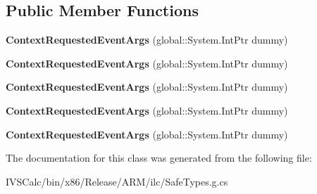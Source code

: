 \subsection*{Public Member Functions}
\begin{DoxyCompactItemize}
\item 
\mbox{\label{class_windows_1_1_u_i_1_1_xaml_1_1_input_1_1_context_requested_event_args_a840bb18409b213c829dc83f257d159c5}} 
{\bfseries Context\+Requested\+Event\+Args} (global\+::\+System.\+Int\+Ptr dummy)
\item 
\mbox{\label{class_windows_1_1_u_i_1_1_xaml_1_1_input_1_1_context_requested_event_args_a840bb18409b213c829dc83f257d159c5}} 
{\bfseries Context\+Requested\+Event\+Args} (global\+::\+System.\+Int\+Ptr dummy)
\item 
\mbox{\label{class_windows_1_1_u_i_1_1_xaml_1_1_input_1_1_context_requested_event_args_a840bb18409b213c829dc83f257d159c5}} 
{\bfseries Context\+Requested\+Event\+Args} (global\+::\+System.\+Int\+Ptr dummy)
\item 
\mbox{\label{class_windows_1_1_u_i_1_1_xaml_1_1_input_1_1_context_requested_event_args_a840bb18409b213c829dc83f257d159c5}} 
{\bfseries Context\+Requested\+Event\+Args} (global\+::\+System.\+Int\+Ptr dummy)
\item 
\mbox{\label{class_windows_1_1_u_i_1_1_xaml_1_1_input_1_1_context_requested_event_args_a840bb18409b213c829dc83f257d159c5}} 
{\bfseries Context\+Requested\+Event\+Args} (global\+::\+System.\+Int\+Ptr dummy)
\end{DoxyCompactItemize}


The documentation for this class was generated from the following file\+:\begin{DoxyCompactItemize}
\item 
I\+V\+S\+Calc/bin/x86/\+Release/\+A\+R\+M/ilc/Safe\+Types.\+g.\+cs\end{DoxyCompactItemize}
